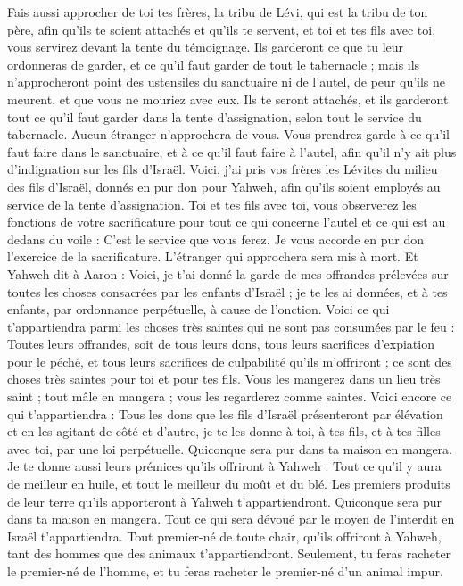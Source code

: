 \begin{multicols}{2}
Fais aussi approcher de toi tes frères, la tribu de Lévi, qui est la tribu de ton père, afin qu'ils te soient attachés et qu'ils te servent, et toi et tes fils avec toi, vous servirez devant la tente du témoignage.
Ils garderont ce que tu leur ordonneras de garder, et ce qu'il faut garder de tout le tabernacle ; mais ils n'approcheront point des ustensiles du sanctuaire ni de l'autel, de peur qu'ils ne meurent, et que vous ne mouriez avec eux.
Ils te seront attachés, et ils garderont tout ce qu'il faut garder dans la tente d'assignation, selon tout le service du tabernacle. Aucun étranger n'approchera de vous.
Vous prendrez garde à ce qu'il faut faire dans le sanctuaire, et à ce qu'il faut faire à l'autel, afin qu'il n'y ait plus d'indignation sur les fils d'Israël.
Voici, j'ai pris vos frères les Lévites du milieu des fils d'Israël, donnés en pur don pour Yahweh, afin qu'ils soient employés au service de la tente d'assignation.
Toi et tes fils avec toi, vous observerez les fonctions de votre sacrificature pour tout ce qui concerne l'autel et ce qui est au dedans du voile : C’est le service que vous ferez. Je vous accorde en pur don l’exercice de la sacrificature. L’étranger qui approchera sera mis à mort.
Et Yahweh dit à Aaron : Voici, je t'ai donné la garde de mes offrandes prélevées sur toutes les choses consacrées par les enfants d'Israël ; je te les ai données, et à tes enfants, par ordonnance perpétuelle, à cause de l'onction.
Voici ce qui t'appartiendra parmi les choses très saintes qui ne sont pas consumées par le feu : Toutes leurs offrandes, soit de tous leurs dons, tous leurs sacrifices d’expiation pour le péché, et tous leurs sacrifices de culpabilité qu’ils m’offriront ; ce sont des choses très saintes pour toi et pour tes fils.
Vous les mangerez dans un lieu très saint ; tout mâle en mangera ; vous les regarderez comme saintes.
Voici encore ce qui t'appartiendra : Tous les dons que les fils d'Israël présenteront par élévation et en les agitant de côté et d’autre, je te les donne à toi, à tes fils, et à tes filles avec toi, par une loi perpétuelle. Quiconque sera pur dans ta maison en mangera.
Je te donne aussi leurs prémices qu'ils offriront à Yahweh : Tout ce qu’il y aura de meilleur en huile, et tout le meilleur du moût et du blé.
Les premiers produits de leur terre qu'ils apporteront à Yahweh t'appartiendront. Quiconque sera pur dans ta maison en mangera.
Tout ce qui sera dévoué par le moyen de l’interdit en Israël t'appartiendra.
Tout premier-né de toute chair, qu'ils offriront à Yahweh, tant des hommes que des animaux t'appartiendront. Seulement, tu feras racheter le premier-né de l'homme, et tu feras racheter  le premier-né d’un animal impur.

\end{multicols}
